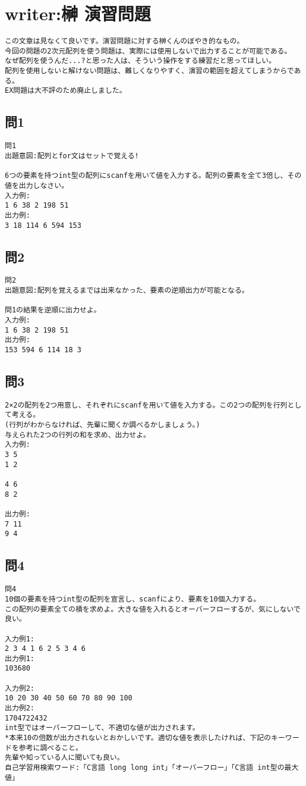 \section{writer:榊 演習問題}
\begin{verbatim}
この文章は見なくて良いです。演習問題に対する榊くんのぼやき的なもの。
今回の問題の2次元配列を使う問題は、実際には使用しないで出力することが可能である。
なぜ配列を使うんだ...?と思った人は、そういう操作をする練習だと思ってほしい。
配列を使用しないと解けない問題は、難しくなりやすく、演習の範囲を超えてしまうからである。
EX問題は大不評のため廃止しました。
\end{verbatim}
\subsection{問1}
\begin{verbatim}
問1
出題意図:配列とfor文はセットで覚える!

6つの要素を持つint型の配列にscanfを用いて値を入力する。配列の要素を全て3倍し、その値を出力しなさい。
入力例:
1 6 38 2 198 51
出力例:
3 18 114 6 594 153
\end{verbatim}


\subsection{問2}
\begin{verbatim}
問2
出題意図:配列を覚えるまでは出来なかった、要素の逆順出力が可能となる。

問1の結果を逆順に出力せよ。
入力例:
1 6 38 2 198 51
出力例:
153 594 6 114 18 3
\end{verbatim}

\subsection{問3}
\begin{verbatim}
2×2の配列を2つ用意し、それぞれにscanfを用いて値を入力する。この2つの配列を行列として考える。
(行列がわからなければ、先輩に聞くか調べるかしましょう。)
与えられた2つの行列の和を求め、出力せよ。
入力例:
3 5
1 2

4 6
8 2

出力例:
7 11
9 4
\end{verbatim}

\subsection{問4}
\begin{verbatim}
問4
10個の要素を持つint型の配列を宣言し、scanfにより、要素を10個入力する。
この配列の要素全ての積を求めよ。大きな値を入れるとオーバーフローするが、気にしないで良い。

入力例1:
2 3 4 1 6 2 5 3 4 6
出力例1:
103680

入力例2:
10 20 30 40 50 60 70 80 90 100
出力例2:
1704722432
int型ではオーバーフローして、不適切な値が出力されます。
*本来10の倍数が出力されないとおかしいです。適切な値を表示したければ、下記のキーワードを参考に調べること。
先輩や知っている人に聞いても良い。
自己学習用検索ワード:「C言語 long long int」「オーバーフロー」「C言語 int型の最大値」
\end{verbatim}


